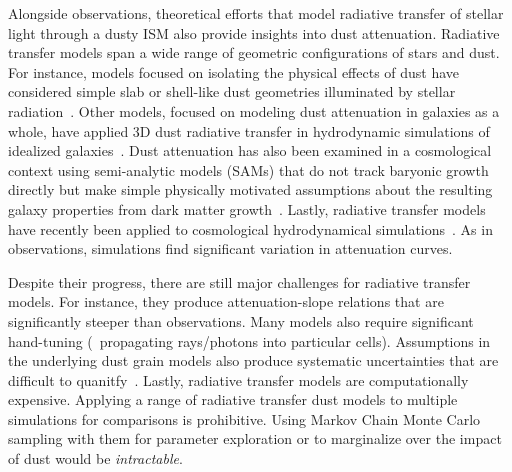 Alongside observations, theoretical efforts that model radiative transfer of
stellar light through a dusty ISM also provide insights into dust attenuation.
Radiative transfer models span a wide range of geometric configurations of
stars and dust. For instance, models focused on isolating the physical effects
of dust have considered simple slab or shell-like dust geometries illuminated
by stellar radiation~\citep[\eg][]{witt1996, witt2000, seon2016}. Other models,
focused on modeling dust attenuation in galaxies as a whole, have applied 3D
dust radiative transfer in hydrodynamic simulations of idealized
galaxies~\citep[\eg][]{jonsson2006, rocha2008, hayward2015, natale2015,
hou2017}. Dust attenuation has also been examined in a cosmological context
using semi-analytic models (SAMs) that do not track baryonic growth directly 
but make simple physically motivated assumptions about the resulting galaxy
properties from dark matter growth~\citep[\eg][]{granato2000,
fontanot2009, wilkins2012, gonzalez-perez2013}. Lastly, radiative transfer
models have recently been applied to cosmological hydrodynamical
simulations~\cite[\eg][]{camps2015, narayanan2018, trayford2020}. As in
observations, simulations find significant variation in attenuation
curves. %

Despite their progress, there are still major challenges for radiative
transfer models. For instance, they produce attenuation-slope relations that
are significantly steeper than observations. Many models also require
significant hand-tuning (\eg~propagating rays/photons into
particular cells). Assumptions in the underlying dust grain models also produce
systematic uncertainties that are difficult to quanitfy~\citep[see][for a
review]{steinacker2013}. Lastly, radiative transfer models 
are computationally expensive. Applying a range of radiative transfer dust
models to multiple simulations for comparisons is prohibitive. Using Markov
Chain Monte Carlo sampling with them for parameter exploration or to marginalize
over the impact of dust would be {\em intractable}. 

